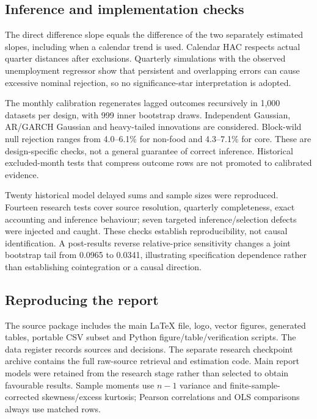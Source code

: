 \documentclass[10pt,a4paper]{article}
\begin{document}
\subsection*{Inference and implementation checks}
The direct difference slope equals the difference of the two separately estimated slopes, including when a calendar trend is used. Calendar HAC respects actual quarter distances after exclusions. Quarterly simulations with the observed unemployment regressor show that persistent and overlapping errors can cause excessive nominal rejection, so no significance-star interpretation is adopted.

The monthly calibration regenerates lagged outcomes recursively in 1,000 datasets per design, with 999 inner bootstrap draws. Independent Gaussian, AR/GARCH Gaussian and heavy-tailed innovations are considered. Block-wild null rejection ranges from 4.0--6.1\% for non-food and 4.3--7.1\% for core. These are design-specific checks, not a general guarantee of correct inference. Historical excluded-month tests that compress outcome rows are not promoted to calibrated evidence.

Twenty historical model delayed sums and sample sizes were reproduced. Fourteen research tests cover source resolution, quarterly completeness, exact accounting and inference behaviour; seven targeted inference/selection defects were injected and caught. These checks establish reproducibility, not causal identification. A post-results reverse relative-price sensitivity changes a joint bootstrap tail from 0.0965 to 0.0341, illustrating specification dependence rather than establishing cointegration or a causal direction.

\subsection*{Reproducing the report}
The source package includes the main LaTeX file, logo, vector figures, generated tables, portable CSV subset and Python figure/table/verification scripts. The data register records sources and decisions. The separate research checkpoint archive contains the full raw-source retrieval and estimation code. Main report models were retained from the research stage rather than selected to obtain favourable results. Sample moments use $n-1$ variance and finite-sample-corrected skewness/excess kurtosis; Pearson correlations and OLS comparisons always use matched rows.
\end{document}
